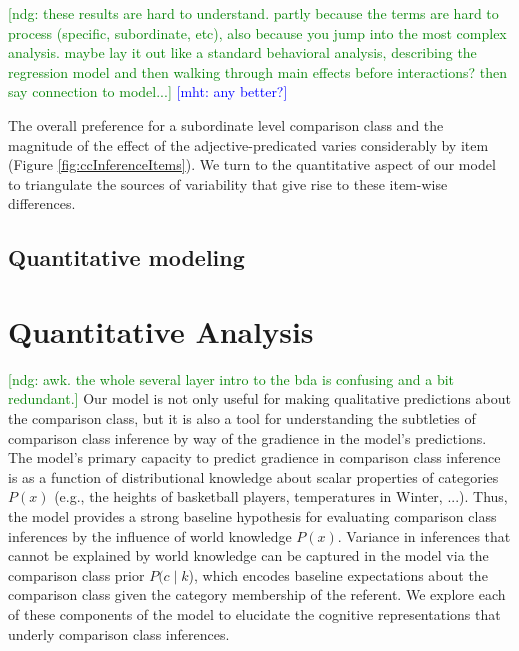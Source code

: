 \documentclass[doc]{apa6}
\newcommand{\ndg}[1]{\textcolor{Green}{[ndg: #1]}}
\newcommand{\mht}[1]{\textcolor{Blue}{[mht: #1]}}
\begin{document}
\ndg{these results are hard to understand. partly because the terms are hard to process (specific, subordinate, etc), also because you jump into the most complex analysis. maybe lay it out like a standard behavioral analysis, describing the regression model and then walking through main effects before interactions? then say connection to model...}
\mht{any better?}


The overall preference for a subordinate level comparison class and the magnitude of the effect of the adjective-predicated varies considerably by item (Figure \ref{fig:ccInferenceItems}).
We turn to the quantitative aspect of our model to triangulate the sources of variability that give rise to these item-wise differences.

\subsection{Quantitative modeling}


\section{Quantitative Analysis}

\ndg{awk. the whole several layer intro to the bda is confusing and a bit redundant.}
Our model is not only useful for making qualitative predictions about the comparison class, but it is also a tool for understanding the subtleties of comparison class inference by way of the gradience in the model's predictions.
The model's primary capacity to predict gradience in comparison class inference is as a function of distributional knowledge about scalar properties of categories $P(x)$ (e.g., the heights of basketball players, temperatures in Winter, ...).
Thus, the model provides a strong baseline hypothesis for evaluating comparison class inferences by the influence of world knowledge $P(x)$.
Variance in inferences that cannot be explained by world knowledge can be captured in the model via the comparison class prior $P(c \mid k$), which encodes baseline expectations about the comparison class given the category membership of the referent.
We explore each of these components of the model to elucidate the cognitive representations that underly comparison class inferences.
\end{document}
